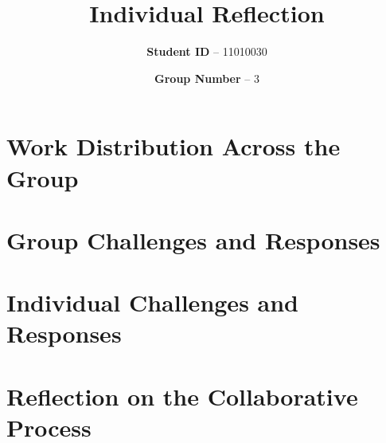 \documentclass[paper=a4,fontsize=12pt]{article}
\title{Individual Reflection}
\author{\textbf{Student ID} -- 11010030}
\date{\textbf{Group Number} -- 3}
\begin{document}
\maketitle

\section{Work Distribution Across the Group}

\section{Group Challenges and Responses}

\section{Individual Challenges and Responses}

\section{Reflection on the Collaborative Process}
\end{document}
